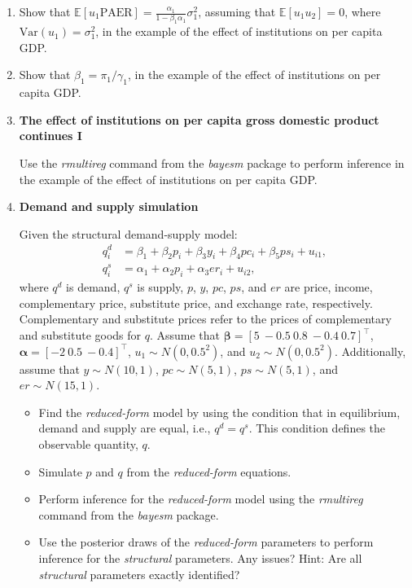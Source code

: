 \begin{enumerate}
	\item Show that $\mathbb{E}[u_1\text{PAER}] = \frac{\alpha_1}{1 - \beta_1\alpha_1} \sigma_1^2$, assuming that $\mathbb{E}[u_1 u_2] = 0$, where $\text{Var}(u_1) = \sigma_1^2$, in the example of the effect of institutions on per capita GDP.
	
	\item Show that $\beta_1=\pi_1/\gamma_1$, in the example of the effect of institutions on per capita GDP.
	
	\item \textbf{The effect of institutions on per capita gross domestic product continues I}
	
	Use the \textit{rmultireg} command from the \textit{bayesm} package to perform inference in the example of the effect of institutions on per capita GDP. 
	
	\item \textbf{Demand and supply simulation}
	
	Given the structural demand-supply model:
\begin{align*}
	q_i^d &= \beta_1 + \beta_2 p_i + \beta_3 y_i + \beta_4 pc_i + \beta_5 ps_i + u_{i1}, \\
	q_i^s &= \alpha_1 + \alpha_2 p_i + \alpha_3 er_i + u_{i2},
\end{align*}
where $q^d$ is demand, $q^s$ is supply, $p$, $y$, $pc$, $ps$, and $er$ are price, income, complementary price, substitute price, and exchange rate, respectively. Complementary and substitute prices refer to the prices of complementary and substitute goods for $q$. Assume that $\bm{\beta} = \left[ 5 \ -0.5 \ 0.8 \ -0.4 \ 0.7 \right]^{\top}$, $\bm{\alpha} = \left[ -2 \ 0.5 \ -0.4 \right]^{\top}$, $u_1 \sim N(0, 0.5^2)$, and $u_2 \sim N(0, 0.5^2)$. Additionally, assume that $y \sim N(10, 1)$, $pc \sim N(5, 1)$, $ps \sim N(5, 1)$, and $er \sim N(15, 1)$.

\begin{itemize}
	\item Find the \textit{reduced-form} model by using the condition that in equilibrium, demand and supply are equal, i.e., $q^d = q^s$. This condition defines the observable quantity, $q$.
	\item Simulate $p$ and $q$ from the \textit{reduced-form} equations.
	\item Perform inference for the \textit{reduced-form} model using the \textit{rmultireg} command from the \textit{bayesm} package.
	\item Use the posterior draws of the \textit{reduced-form} parameters to perform inference for the \textit{structural} parameters. Any issues? Hint: Are all \textit{structural} parameters exactly identified?
\end{itemize}


\end{enumerate}
